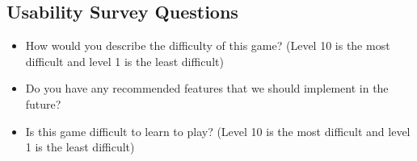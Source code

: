 \documentclass[12pt]{article}
\begin{document}
\subsection{Usability Survey Questions}
\begin{itemize}
\item How would you describe the difficulty of this game?
(Level 10 is the most difficult and level 1 is the 
least difficult)
\item Do you have any recommended features that we should
implement in the future?
\item Is this game difficult to learn to play? (Level 10 is the most difficult and level 1 is the 
least difficult)
\end{itemize}
\end{document}
